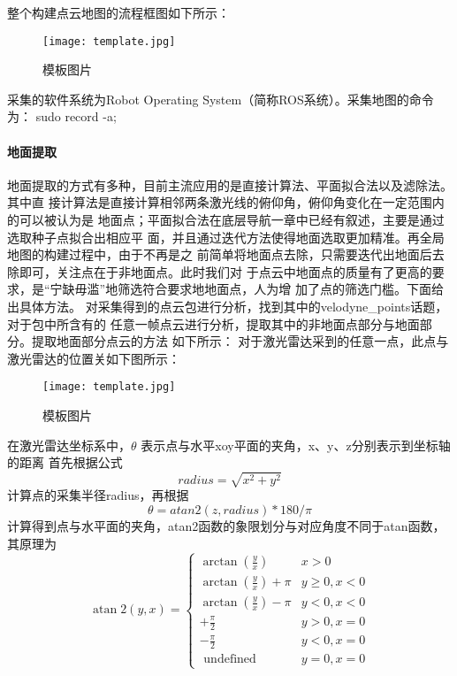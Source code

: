 整个构建点云地图的流程框图如下所示：
\begin{figure}[ht]
    \centering
    \texttt{[image: template.jpg]}
    \caption{模板图片}
\end{figure}

采集的软件系统为Robot Operating System（简称ROS系统）。采集地图的命令为：
sudo record -a;

\paragraph{地面提取}
地面提取的方式有多种，目前主流应用的是直接计算法、平面拟合法以及滤除法。其中直
接计算法是直接计算相邻两条激光线的俯仰角，俯仰角变化在一定范围内的可以被认为是
地面点；平面拟合法在底层导航一章中已经有叙述，主要是通过选取种子点拟合出相应平
面，并且通过迭代方法使得地面选取更加精准。再全局地图的构建过程中，由于不再是之
前简单将地面点去除，只需要迭代出地面后去除即可，关注点在于非地面点。此时我们对
于点云中地面点的质量有了更高的要求，是“宁缺毋滥”地筛选符合要求地地面点，人为增
加了点的筛选门槛。下面给出具体方法。
对采集得到的点云包进行分析，找到其中的velodyne\_points话题，对于包中所含有的
任意一帧点云进行分析，提取其中的非地面点部分与地面部分。提取地面部分点云的方法
如下所示：
对于激光雷达采到的任意一点，此点与激光雷达的位置关如下图所示：
\begin{figure}[ht]
    \centering
    \texttt{[image: template.jpg]}
    \caption{模板图片}
\end{figure}

在激光雷达坐标系中，$\theta$ 表示点与水平xoy平面的夹角，x、y、z分别表示到坐标轴的距离
首先根据公式
\begin{equation}
    radius = \sqrt{x^2 + y^2}
\end{equation}
计算点的采集半径radius，再根据
\begin{equation}
    \theta = atan2(z ,radius) * 180 / \pi 
\end{equation}
计算得到点与水平面的夹角，atan2函数的象限划分与对应角度不同于atan函数，其原理为
\begin{equation}
\operatorname{atan} 2(y, x)=\left\{\begin{array}{ll}
    \arctan \left(\frac{y}{x}\right) & x>0 \\
    \arctan \left(\frac{y}{x}\right)+\pi & y \geq 0, x<0 \\
    \arctan \left(\frac{y}{x}\right)-\pi & y<0, x<0 \\
    +\frac{\pi}{2} & y>0, x=0 \\
    -\frac{\pi}{2} & y<0, x=0 \\
    \text { undefined } & y=0, x=0
    \end{array}\right.
\end{equation}

